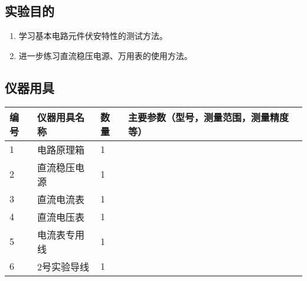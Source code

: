 \documentclass[dvipsnames, svgnames,a4paper,11pt]{article}
\begin{document}
	\subsection{实验目的}
	\begin{enumerate}
		\item 学习基本电路元件伏安特性的测试方法。
		\item 进一步练习直流稳压电源、万用表的使用方法。
		
	\end{enumerate}
	
	\subsection{仪器用具}
	\begin{table}[htbp]
		\centering
		\renewcommand\arraystretch{1.6}
		\begin{tabular}{p{}|p{}|p{}|p{}}
			\hline
			编号& 仪器用具名称 & 数量 &  主要参数（型号，测量范围，测量精度等） \\
			\hline
			1& 电路原理箱 & 1 &  \\
			
				2& 直流稳压电源 & 1 &  \\
			
				3& 直流电流表 & 1 &  \\
		
				4& 直流电压表 & 1 &  \\
			
				5& 电流表专用线  & 1 &  \\
		
				6& 2号实验导线  & 1 &  \\
			\hline
		\end{tabular}
	\end{table}
	
\end{document}
